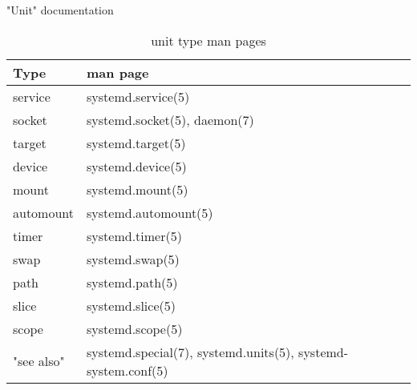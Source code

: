 \begin{frame}
	{"Unit" documentation}
 \begin{longtable}{| m{5em} | m{30em} | }
                \caption{unit type man pages} \\
                \hline
                   \textbf{Type}                        &
		\textbf{man page}                    \\
                \hline
                service                                &
	       systemd.service(5) \\
                \hline
                   socket &
		systemd.socket(5), daemon(7)     \\
                \hline
                target &
		systemd.target(5) \\
                \hline
                 device &
		 systemd.device(5) \\
                   \hline
                   mount &
		   systemd.mount(5) \\
                   \hline
                   automount &
		   systemd.automount(5) \\
                   \hline
                   timer  &
		   systemd.timer(5) \\
                   \hline
                   swap &
		   systemd.swap(5) \\
                   \hline
                   path &
		   systemd.path(5) \\
                   \hline
                   slice &
                   systemd.slice(5) \\
                   \hline
                   scope &
		   systemd.scope(5) \\
                   \hline
		   "see also" &
		   systemd.special(7), systemd.units(5), systemd-system.conf(5) \\ 
		   \hline


        \end{longtable}

\end{frame}

\cprotect\note{

}

